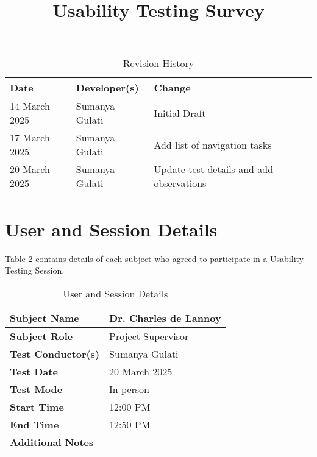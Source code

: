 \documentclass{article}
\title{Usability Testing Survey\\\progname}
\author{\authname}
\date{}
\begin{document}
\maketitle

\begin{table}[hp]
\caption{Revision History} \label{TblRevisionHistory}
\begin{tabularx}{\textwidth}{llX}
\toprule
\textbf{Date} & \textbf{Developer(s)} & \textbf{Change}\\
\midrule
14 March 2025 & Sumanya Gulati & Initial Draft\\
17 March 2025 & Sumanya Gulati & Add list of navigation tasks\\
20 March 2025 & Sumanya Gulati & Update test details and add observations\\
\bottomrule
\end{tabularx}
\end{table}

\newpage

\section{User and Session Details}
Table \ref{UserDetails} contains details of each subject who agreed to participate in a 
Usability Testing Session.
\begin{table}[hp]
\begin{tabularx}{\textwidth}{l | X}
\toprule
\textbf{Subject Name} & Dr. Charles de Lannoy \\
\midrule
\textbf{Subject Role} & Project Supervisor \\
\midrule
\textbf{Test Conductor(s)} & Sumanya Gulati \\
\midrule
\textbf{Test Date} & 20 March 2025 \\
\midrule
\textbf{Test Mode} & In-person \\
\midrule
\textbf{Start Time} & 12:00 PM \\
\midrule
\textbf{End Time} & 12:50 PM \\
\midrule
\textbf{Additional Notes} & - \\
\bottomrule
\end{tabularx}
\caption{User and Session Details} \label{UserDetails}
\end{table}
\end{document}
